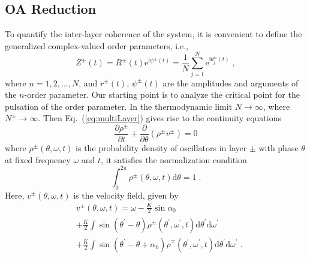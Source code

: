 \documentclass{article}
\begin{document}
\newpage
\color{red}
\subsection{OA Reduction}

To quantify the inter-layer coherence of the system, it is convenient to define the generalized complex-valued
order parameters, i.e.,
\begin{equation}
    \label{eq:orderParameter}
    Z^{\pm}\left( t \right) =R^{\pm}\left( t \right) \text{e}^{\text{i}\psi^{\pm}\left( t \right)}=\frac{1}{N}\sum_{j=1}^N{\text{e}^{\text{i}\theta _{j}^{\pm}\left( t \right)}}\;,
\end{equation}
where $n=1,2,\dots, N$, and $r^{\pm}\left( t \right)$, $\psi ^{\pm}\left( t \right)$ are the amplitudes and arguments of the $n$-order parameter.
Our starting point is to analyze the critical point for the pulsation of the order parameter.
In the thermodynamic limit $N\rightarrow \infty$, where $N^{\pm}\rightarrow \infty$. Then
Eq.~(\ref{eq:multiLayer}) gives rise to the continuity equations
\begin{equation}
    \label{eq:continuity}
    \frac{\partial \rho ^{\pm}}{\partial t}+\frac{\partial}{\partial \theta}\left( \rho ^{\pm}v^{\pm} \right) =0
\end{equation}
where $\rho ^{\pm}\left( \theta ,\omega ,t \right)$ is the probability density of oscillators in layer $\pm$ with phase $\theta$ at fixed frequency $\omega$ and $t$, it satisfies the normalization condition
\begin{equation}
    \label{eq:normalization}
    \int_{0}^{2\pi}{\rho ^{\pm}\left( \theta ,\omega ,t \right) \text{d}\theta} =1\;.
\end{equation}
Here, $v^{\pm}\left( \theta ,\omega ,t \right)$ is the velocity field, given by
\begin{equation}
    \begin{aligned}
        &v^{\pm}\left( \theta ,\omega ,t \right) =\omega -\frac{K}{2}\sin \alpha _0\\
        &+\frac{K}{2}\int{\sin \left( \theta ^{\prime}-\theta \right) \rho ^{\pm}\left( \theta ^{\prime},\omega ^{\prime},t \right) \text{d}\theta ^{\prime}\text{d}\omega ^{\prime}}\\
        &+\frac{K}{2}\int{\sin \left( \theta ^{\prime}-\theta +\alpha _0 \right) \rho ^{\mp}\left( \theta ^{\prime},\omega ^{\prime},t \right) \text{d}\theta ^{\prime}\text{d}\omega ^{\prime}}\;.\\
    \end{aligned}
\end{equation}
\end{document}
